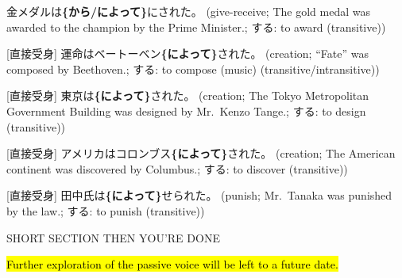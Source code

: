 \documentclass[../nihongo-gakushuu-kyouzai.tex]{subfiles}
\begin{document}
\begin{itemize}
    [直接受身] 金メダルは\textbf{\{から/によって\}}にされた。 (give-receive; The gold medal was awarded to the champion by the Prime Minister.; する: to award (transitive))

    [直接受身] 運命はベートーベン\textbf{\{によって\}}された。 (creation; ``Fate'' was composed by Beethoven.; する: to compose (music) (transitive/intransitive))

    [直接受身] 東京は\textbf{\{によって\}}された。 (creation; The Tokyo Metropolitan Government Building was designed by Mr.~Kenzo Tange.; する: to design (transitive))

    [直接受身] アメリカはコロンブス\textbf{\{によって\}}された。 (creation; The American continent was discovered by Columbus.; する: to discover (transitive))

    [直接受身] 田中氏は\textbf{\{によって\}}せられた。 (punish; Mr.~Tanaka was punished by the law.; する: to punish (transitive))

    SHORT SECTION THEN YOU'RE DONE
\end{itemize}

\hl{Further exploration of the passive voice will be left to a future date.}
\end{document}
